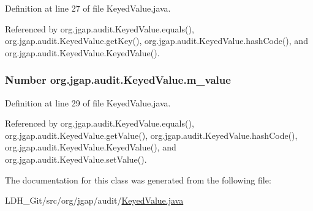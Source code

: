 Definition at line 27 of file Keyed\-Value.\-java.



Referenced by org.\-jgap.\-audit.\-Keyed\-Value.\-equals(), org.\-jgap.\-audit.\-Keyed\-Value.\-get\-Key(), org.\-jgap.\-audit.\-Keyed\-Value.\-hash\-Code(), and org.\-jgap.\-audit.\-Keyed\-Value.\-Keyed\-Value().

\hypertarget{classorg_1_1jgap_1_1audit_1_1_keyed_value_ac1f92c83790bcc8f42a78b8adc0d1a64}{
\subsubsection[{m\-\_\-value}]{\setlength{\rightskip}{0pt plus 5cm}Number org.\-jgap.\-audit.\-Keyed\-Value.\-m\-\_\-value\hspace{0.3cm}{\ttfamily [private]}}}\label{classorg_1_1jgap_1_1audit_1_1_keyed_value_ac1f92c83790bcc8f42a78b8adc0d1a64}


Definition at line 29 of file Keyed\-Value.\-java.



Referenced by org.\-jgap.\-audit.\-Keyed\-Value.\-equals(), org.\-jgap.\-audit.\-Keyed\-Value.\-get\-Value(), org.\-jgap.\-audit.\-Keyed\-Value.\-hash\-Code(), org.\-jgap.\-audit.\-Keyed\-Value.\-Keyed\-Value(), and org.\-jgap.\-audit.\-Keyed\-Value.\-set\-Value().



The documentation for this class was generated from the following file\-:\begin{DoxyCompactItemize}
\item 
L\-D\-H\-\_\-\-Git/src/org/jgap/audit/\hyperlink{_keyed_value_8java}{Keyed\-Value.\-java}\end{DoxyCompactItemize}
